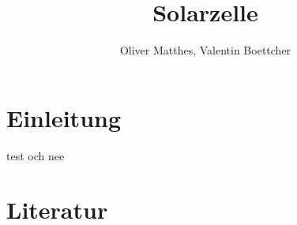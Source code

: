 \documentclass[slug=SZ, room=Hermann-Krone-Bau\,\ Labor\ 1.25, supervisor=Tim\ Ziegler]{../../Lab_Report_LaTeX/lab_report}
\title{Solarzelle}
\author{Oliver Matthes, Valentin Boettcher}
\begin{document}
\maketitle

\section{Einleitung}
\label{sec:einl}

test och nee

\section{Literatur}
\label{sec:literatur}

\printbibliography
\end{document}
